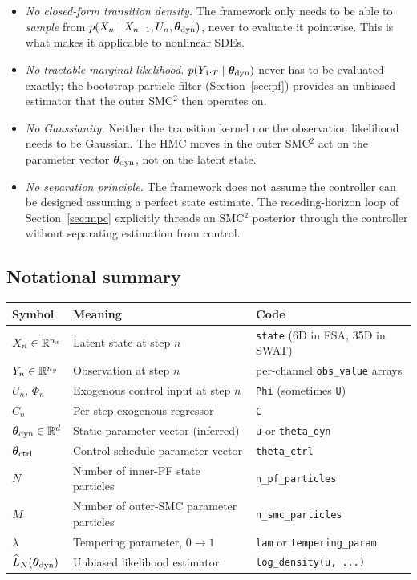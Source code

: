 \begin{itemize}
  \item \emph{No closed-form transition density.} The framework only
        needs to be able to \emph{sample} from
        $p(X_n \mid X_{n-1}, U_n, \bm{\theta}_{\rm dyn})$, never to evaluate it
        pointwise. This is what makes it applicable to nonlinear SDEs.
  \item \emph{No tractable marginal likelihood.}
        $p(Y_{1:T} \mid \bm{\theta}_{\rm dyn})$ never has to be evaluated exactly;
        the bootstrap particle filter (Section~\ref{sec:pf}) provides
        an unbiased estimator that the outer SMC$^2$ then operates on.
  \item \emph{No Gaussianity.} Neither the transition kernel nor the
        observation likelihood needs to be Gaussian. The HMC moves in
        the outer SMC$^2$ act on the parameter vector $\bm{\theta}_{\rm dyn}$, not
        on the latent state.
  \item \emph{No separation principle.} The framework does not assume
        the controller can be designed assuming a perfect state
        estimate. The receding-horizon loop of Section~\ref{sec:mpc}
        explicitly threads an SMC$^2$ posterior through the controller
        without separating estimation from control.
\end{itemize}

\subsection{Notational summary}

\begin{center}\small
\begin{tabular}{lll}
\toprule
Symbol & Meaning & Code \\
\midrule
$X_n \in \mathbb{R}^{n_x}$    & Latent state at step $n$                    & \texttt{state} (6D in FSA, 35D in SWAT) \\
$Y_n \in \mathbb{R}^{n_y}$    & Observation at step $n$                    & per-channel \texttt{obs\_value} arrays \\
$U_n,\, \Phi_n$       & Exogenous control input at step $n$        & \texttt{Phi} (sometimes \texttt{U}) \\
$C_n$                 & Per-step exogenous regressor               & \texttt{C} \\
$\bm{\theta}_{\rm dyn} \in \mathbb{R}^d$  & Static parameter vector (inferred)         & \texttt{u} or \texttt{theta\_dyn} \\
$\bm{\theta}_{\rm ctrl}$          & Control-schedule parameter vector          & \texttt{theta\_ctrl} \\
$N$                   & Number of inner-PF state particles         & \texttt{n\_pf\_particles} \\
$M$                   & Number of outer-SMC parameter particles    & \texttt{n\_smc\_particles} \\
$\lambda$             & Tempering parameter, $0 \to 1$             & \texttt{lam} or \texttt{tempering\_param} \\
$\widehat{L}_N(\bm{\theta}_{\rm dyn})$  & Unbiased likelihood estimator              & \texttt{log\_density(u, ...)} \\
\bottomrule
\end{tabular}
\end{center}

